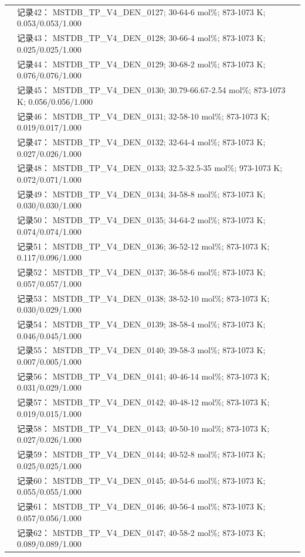 \documentclass[12pt]{article}
\begin{document}
{\begin{longtable}[]{@{}
  >{\raggedright\arraybackslash}p{}
  >{\raggedright\arraybackslash}p{}@{}}
 & 记录42： MSTDB\_TP\_V4\_DEN\_0127; 30-64-6 mol\%; 873-1073 K; 0.053/0.053/1.000 \\
 & 记录43： MSTDB\_TP\_V4\_DEN\_0128; 30-66-4 mol\%; 873-1073 K; 0.025/0.025/1.000 \\
 & 记录44： MSTDB\_TP\_V4\_DEN\_0129; 30-68-2 mol\%; 873-1073 K; 0.076/0.076/1.000 \\
 & 记录45： MSTDB\_TP\_V4\_DEN\_0130; 30.79-66.67-2.54 mol\%; 873-1073 K; 0.056/0.056/1.000 \\
 & 记录46： MSTDB\_TP\_V4\_DEN\_0131; 32-58-10 mol\%; 873-1073 K; 0.019/0.017/1.000 \\
 & 记录47： MSTDB\_TP\_V4\_DEN\_0132; 32-64-4 mol\%; 873-1073 K; 0.027/0.026/1.000 \\
 & 记录48： MSTDB\_TP\_V4\_DEN\_0133; 32.5-32.5-35 mol\%; 973-1073 K; 0.072/0.071/1.000 \\
 & 记录49： MSTDB\_TP\_V4\_DEN\_0134; 34-58-8 mol\%; 873-1073 K; 0.030/0.030/1.000 \\
 & 记录50： MSTDB\_TP\_V4\_DEN\_0135; 34-64-2 mol\%; 873-1073 K; 0.074/0.074/1.000 \\
 & 记录51： MSTDB\_TP\_V4\_DEN\_0136; 36-52-12 mol\%; 873-1073 K; 0.117/0.096/1.000 \\
 & 记录52： MSTDB\_TP\_V4\_DEN\_0137; 36-58-6 mol\%; 873-1073 K; 0.057/0.057/1.000 \\
 & 记录53： MSTDB\_TP\_V4\_DEN\_0138; 38-52-10 mol\%; 873-1073 K; 0.030/0.029/1.000 \\
 & 记录54： MSTDB\_TP\_V4\_DEN\_0139; 38-58-4 mol\%; 873-1073 K; 0.046/0.045/1.000 \\
 & 记录55： MSTDB\_TP\_V4\_DEN\_0140; 39-58-3 mol\%; 873-1073 K; 0.007/0.005/1.000 \\
 & 记录56： MSTDB\_TP\_V4\_DEN\_0141; 40-46-14 mol\%; 873-1073 K; 0.031/0.029/1.000 \\
 & 记录57： MSTDB\_TP\_V4\_DEN\_0142; 40-48-12 mol\%; 873-1073 K; 0.019/0.015/1.000 \\
 & 记录58： MSTDB\_TP\_V4\_DEN\_0143; 40-50-10 mol\%; 873-1073 K; 0.027/0.026/1.000 \\
 & 记录59： MSTDB\_TP\_V4\_DEN\_0144; 40-52-8 mol\%; 873-1073 K; 0.025/0.025/1.000 \\
 & 记录60： MSTDB\_TP\_V4\_DEN\_0145; 40-54-6 mol\%; 873-1073 K; 0.055/0.055/1.000 \\
 & 记录61： MSTDB\_TP\_V4\_DEN\_0146; 40-56-4 mol\%; 873-1073 K; 0.057/0.056/1.000 \\
 & 记录62： MSTDB\_TP\_V4\_DEN\_0147; 40-58-2 mol\%; 873-1073 K; 0.089/0.089/1.000 \\

\end{longtable}}
\end{document}

